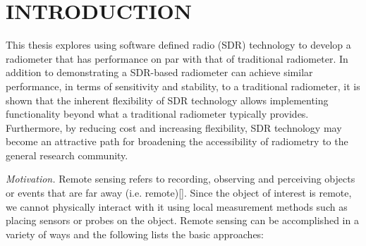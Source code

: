 \chapter{INTRODUCTION}\label{ch:intro}




This thesis explores using software defined radio (SDR) technology to develop a radiometer that has performance on par with that of traditional radiometer.  In addition to demonstrating a SDR-based radiometer can achieve similar performance, in terms of sensitivity and stability, to a traditional radiometer, it is shown that the inherent flexibility of SDR technology allows implementing functionality beyond what a traditional radiometer typically provides.  Furthermore, by reducing cost and increasing flexibility, SDR technology may become an attractive path for broadening the accessibility of radiometry to the general research community.

\emph{Motivation.}  Remote sensing refers to recording, observing and perceiving objects or events that are far away (i.e. remote)[\cite{weng2012}].  Since the object of interest is remote, we cannot physically interact with it using local measurement methods such as placing sensors or probes on the object.  Remote sensing can be accomplished in a variety of ways and the following lists the basic approaches:

